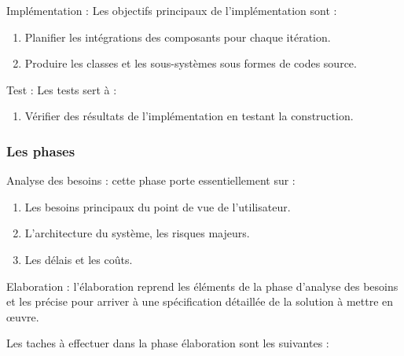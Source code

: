 \documentclass[12pt,a4paper]{report}
\begin{document}
\noindent \begin{flushleft}
	
	
	\noindent Impl\'{e}mentation : Les objectifs principaux de l'impl\'{e}mentation sont :
\end{flushleft}

\begin{enumerate}
	\item  Planifier les int\'{e}grations des composants pour chaque it\'{e}ration.
	
	\item  Produire les classes et les sous-syst\`{e}mes sous formes de codes source.
\end{enumerate}

\noindent \begin{flushleft}
	
	
	\noindent 
	
	\noindent Test : Les tests sert \`{a} :
\end{flushleft}

\begin{enumerate}
	\item  V\'{e}rifier des r\'{e}sultats de l'impl\'{e}mentation en testant la construction.
\end{enumerate}


\subsubsection{ Les phases}

\noindent \begin{flushleft}
	Analyse des besoins : cette phase porte essentiellement sur :
\end{flushleft}

\begin{enumerate}
	\item  Les besoins principaux du point de vue de l'utilisateur.
	
	\item  L'architecture du syst\`{e}me, les risques majeurs.
	
	\item  Les d\'{e}lais et les co\^{u}ts.
\end{enumerate}

\noindent \begin{flushleft}
	
	
	\noindent Elaboration : l'\'{e}laboration reprend les \'{e}l\'{e}ments de la phase d'analyse des besoins et les pr\'{e}cise pour arriver \`{a} une sp\'{e}cification d\'{e}taill\'{e}e de la solution \`{a} mettre en {\oe}uvre.
	
	\noindent Les taches \`{a} effectuer dans la phase \'{e}laboration sont les suivantes :
\end{flushleft}
\end{document}
